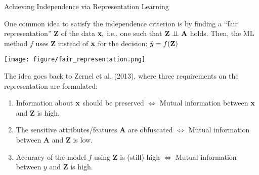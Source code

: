 \documentclass[11pt,compress,t,notes=noshow, xcolor=table]{beamer}
\newcommand{\sens}{\mathbf{A}} %
\begin{document}
\begin{vbframe}{Achieving Independence via Representation Learning}
	\small{
		\begin{itemize}
			\begin{minipage}{0.5\textwidth}	
%				
			\item One common idea to satisfy the independence criterion is by finding a ``fair representation'' $\mathbf{Z}$ of the data $\mathbf{x},$ i.e., one such that $ \mathbf{Z} \indep \sens$ holds.
%			
			Then, the ML method $f$ uses $\mathbf{Z}$ instead of $\mathbf{x}$ for the decision: $\hat{y} = f(\mathbf{Z})$
%			
			\end{minipage}
			\begin{minipage}{0.4\textwidth}
				\centering
				\texttt{[image: figure/fair\_representation.png]}
			\end{minipage}
			\item The idea goes back to Zernel et al. (2013), where three requirements on the representation are formulated:
%			
			\begin{enumerate}
				\small
%				
				\item Information about $\mathbf{x}$ should be preserved $\Leftrightarrow$ Mutual information between $\mathbf{x}$ and $\mathbf{Z}$ is high.
%				
				\item The sensitive attributes/features $\sens$ are obfuscated $\Leftrightarrow$ Mutual information between $\sens$ and $\mathbf{Z}$ is low.
%				
				\item Accuracy of the model $f$ using $\mathbf{Z}$ is (still) high $\Leftrightarrow$ Mutual information between $y$ and $\mathbf{Z}$ is high.
%				
			\end{enumerate}
%			
		\end{itemize}
	}
\end{vbframe}
\end{document}
